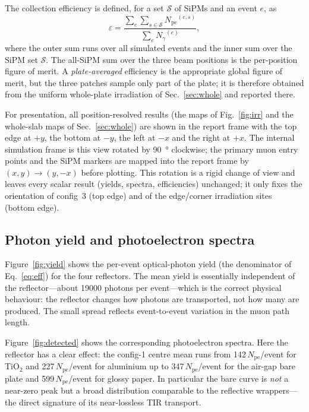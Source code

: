 \documentclass[11pt,a4paper]{article}
\newcommand{\pe}{\ensuremath{N_{\mathrm{pe}}}}
\newcommand{\ngam}{\ensuremath{N_{\gamma}}}
\begin{document}
The collection efficiency is defined, for a set $\mathcal{S}$ of SiPMs and an
event $e$, as
\begin{equation}
  \varepsilon = \frac{\displaystyle\sum_{e}\sum_{s\in\mathcal{S}} \pe^{(e,s)}}
                     {\displaystyle\sum_{e}\ngam^{(e)}},
  \label{eq:eff}
\end{equation}
where the outer sum runs over all simulated events and the inner sum over the
SiPM set $\mathcal{S}$. The all-SiPM sum over the three beam
positions is the per-position figure of merit. A \emph{plate-averaged}
efficiency is the appropriate global figure of merit, but the three patches
sample only part of the plate; it is therefore obtained from the uniform
whole-plate irradiation of Sec.~\ref{sec:whole} and reported there.

For presentation, all position-resolved results (the maps of
Fig.~\ref{fig:irr} and the whole-slab maps
of Sec.~\ref{sec:whole}) are shown in the report frame with the top edge at $+y$,
the bottom at $-y$, the left at $-x$ and the right at $+x$. The internal
simulation frame is this view rotated by \SI{90}{\degree} clockwise; the primary
muon entry points and the SiPM markers are mapped into the report frame by
$(x,y)\to(y,-x)$ before plotting. This rotation is a rigid change of view and
leaves every scalar result (yields, spectra, efficiencies) unchanged; it only
fixes the orientation of config~3 (top edge) and of the edge/corner irradiation
sites (bottom edge).

\subsection{Photon yield and photoelectron spectra}

Figure~\ref{fig:yield} shows the per-event optical-photon yield (the
denominator of Eq.~\ref{eq:eff}) for the four reflectors. The mean yield is
essentially independent of the reflector---about \num{19000} photons per event---which is the correct physical behaviour: the reflector changes how
photons are transported, not how many are produced. The small spread reflects
event-to-event variation in the muon path length.

Figure~\ref{fig:detected} shows the corresponding photoelectron spectra. Here
the reflector has a clear effect: the config-1 centre mean runs from
\num{142}\,\pe/event for TiO$_2$ and \num{227}\,\pe/event for aluminium up to
\num{347}\,\pe/event for the air-gap bare plate and \num{599}\,\pe/event for
glossy paper. In particular the bare curve is \emph{not} a near-zero peak but a
broad distribution comparable to the reflective wrappers---the direct signature
of its near-lossless TIR transport.
\end{document}
